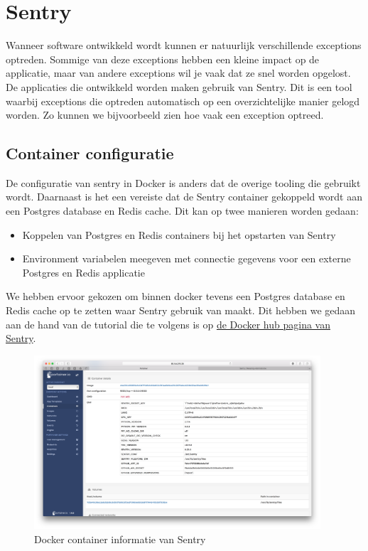 \chapter{Sentry}
Wanneer software ontwikkeld wordt kunnen er natuurlijk verschillende exceptions optreden. Sommige van deze exceptions hebben een kleine impact op de applicatie, maar van andere exceptions wil je vaak dat ze snel worden opgelost.
\newline
De applicaties die ontwikkeld worden maken gebruik van Sentry. Dit is een tool waarbij exceptions die optreden automatisch op een overzichtelijke manier gelogd worden. Zo kunnen we bijvoorbeeld zien hoe vaak een exception optreed.

\section{Container configuratie}
De configuratie van sentry in Docker is anders dat de overige tooling die gebruikt wordt. Daarnaast is het een vereiste dat de Sentry container gekoppeld wordt aan een Postgres database en Redis cache. Dit kan op twee manieren worden gedaan:

\begin{itemize}
	\setlength\itemsep{0em}
	\item Koppelen van Postgres en Redis containers bij het opstarten van Sentry
	\item Environment variabelen meegeven met connectie gegevens voor een externe Postgres en Redis applicatie
\end{itemize}

We hebben ervoor gekozen om binnen docker tevens een Postgres database en Redis cache op te zetten waar Sentry gebruik van maakt. Dit hebben we gedaan aan de hand van de tutorial die te volgens is op \href{https://hub.docker.com/_/sentry/}{de Docker hub pagina van Sentry}.
\newline
\begin{figure}[H]
	\centering
	\includegraphics[width=0.95\textwidth]{img/SentryDockerContainer.png}
	\caption{Docker container informatie van Sentry}
	\label{fig:SentryDockerContainer}
\end{figure}

